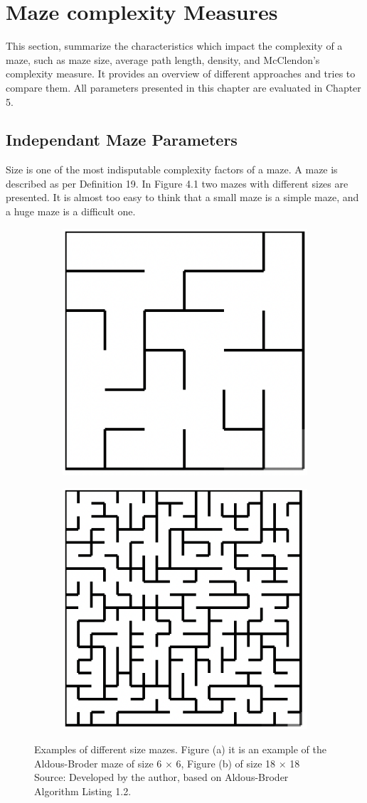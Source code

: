 \section{Maze complexity Measures}
This section, summarize the characteristics which impact the complexity of a maze, such as maze size, average path length, density, and McClendon's complexity measure. It provides an overview of different approaches and tries to compare them. All parameters presented in this chapter are evaluated in Chapter 5.\\
\subsection{Independant Maze Parameters}
Size is one of the most indisputable complexity factors of a maze. A maze is described as per Definition 19. In Figure 4.1 two mazes with different sizes are
presented. It is almost too easy to think that a small maze is a simple maze, and a huge maze is a difficult one.\\
\begin{figure}[!h]
    \centering
    \begin{subfigure}{.5\textwidth}
    \centering
    \includegraphics[width=.5\linewidth]{66}
    \caption{}
\label{fig:sub1}
    \end{subfigure}%
    \begin{subfigure}{.5\textwidth}
    \centering
    \includegraphics[width=.5\linewidth]{1818}
    \caption{}
\label{fig:sub2}
    \end{subfigure}
    \caption{Examples of different size mazes. Figure (a) it is an example of the Aldous-Broder maze of size 6 $\times$ 6, Figure (b) of size 18 $\times$ 18 \\ Source: Developed by the author, based on Aldous-Broder Algorithm Listing 1.2. }
\label{fig:test}
\end{figure}
